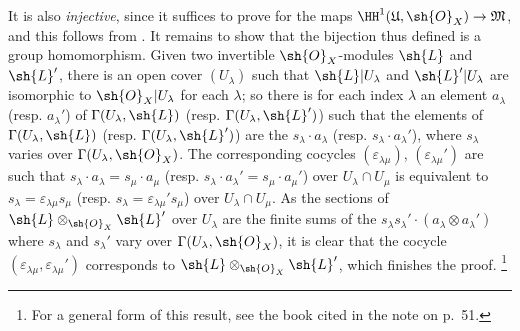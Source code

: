 \begin{env}[5.4.7]
It is also \emph{injective}, since it suffices to prove for the maps $\HH^1(\mathfrak{U},\sh{O}_X)\to\mathfrak{M}$, and this follows from .
It remains to show that
the bijection thus defined is a group homomorphism.
Given two invertible $\sh{O}_X$-modules $\sh{L}$ and $\sh{L}'$, there is an open cover $(U_\lambda)$ such that $\sh{L}|U_\lambda$ and $\sh{L}'|U_\lambda$ are isomorphic to $\sh{O}_X|U_\lambda$ for each $\lambda$;
so there is for each index $\lambda$ an element $a_\lambda$ (resp. $a_\lambda'$) of $\Gamma(U_\lambda,\sh{L})$ (resp. $\Gamma(U_\lambda,\sh{L}')$) such that the elements of $\Gamma(U_\lambda,\sh{L})$ (resp. $\Gamma(U_\lambda,\sh{L}')$) are the $s_\lambda\cdot a_\lambda$ (resp. $s_\lambda\cdot a_\lambda'$), where $s_\lambda$ varies over $\Gamma(U_\lambda,\sh{O}_X)$.
The corresponding cocycles $(\varepsilon_{\lambda\mu})$, $(\varepsilon_{\lambda\mu}')$ are such that $s_\lambda\cdot a_\lambda=s_\mu\cdot a_\mu$ (resp. $s_\lambda\cdot a_\lambda'=s_\mu\cdot a_\mu'$) over $U_\lambda\cap U_\mu$ is equivalent to $s_\lambda=\varepsilon_{\lambda\mu}s_\mu$ (resp. $s_\lambda=\varepsilon_{\lambda\mu}' s_\mu$) over $U_\lambda\cap U_\mu$.
As the sections of $\sh{L}\otimes_{\sh{O}_X}\sh{L}'$ over $U_\lambda$ are the finite sums of the $s_\lambda s_\lambda'\cdot(a_\lambda\otimes a_\lambda')$ where $s_\lambda$ and $s_\lambda'$ vary over $\Gamma(U_\lambda,\sh{O}_X)$, it is clear that the cocycle $(\varepsilon_{\lambda\mu},\varepsilon_{\lambda\mu}')$ corresponds to $\sh{L}\otimes_{\sh{O}_X}\sh{L}'$, which finishes the proof.
\footnote{For a general form of this result, see the book cited in the note on p.~51.}
\end{env}

